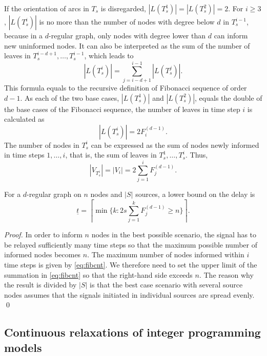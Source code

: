 If the orientation of arcs in $T_s$ is disregarded, $|L(T^1_s)|=|L(T^2_s)|=2$.
For $i\geq 3$, $|L(T^i_s)|$ is no more than the number of nodes with degree below $d$ in $T^{i-1}_s$, 
because in a $d$-regular graph, only nodes with degree lower than $d$ can inform new uninformed nodes.
It can also be interpreted as the sum of the number of leaves in $T^{i-d+1}_s,\dots,T^{i-1}_s$, which leads to %
\begin{equation*}
\label{eq:leafrec}
|L(T^i_s)|=\sum\limits_{j=i-d+1}^{i-1} |L(T^j_s)|.
\end{equation*}  
This formula equals to the recursive definition of Fibonacci sequence of order $d-1$.
As each of the two base cases, $|L(T^1_s)|$ and $|L(T^2_s)|$, equals the double of the base cases of the Fibonacci sequence, the number of leaves in time step $i$ is calculated as
\begin{equation*}
\label{eq:fibleaf}
|L(T^i_s)|=2 F^{(d-1)}_i.
\end{equation*}  
The number of nodes in $T^i_s$ can be expressed as the sum of nodes newly informed in time steps $1,\dots,i$, that is, the sum of leaves in $T^1_s,\dots,T^i_s$. Thus,
\begin{equation}
\label{eq:fibcnt}
|V_{T^i_s}|=|V_i|=2\sum\limits_{j=1}^i F^{(d-1)}_j.
\end{equation}

\begin{proposition}
For a $d$-regular graph on $n$ nodes and $|S|$ sources, a lower bound on the delay is 
\begin{equation*}
\label{lem:lbreg1}
\underline{t}=\left\lceil\min\{k:2s\sum\limits_{j=1}^k F^{(d-1)}_j\geq n\}\right\rceil.
\end{equation*}
\label{prop:lbfib}
\end{proposition}
\begin{proof}
In order to inform $n$ nodes in the best possible scenario, the signal has to be relayed sufficiently many time steps so that the maximum possible number of informed nodes becomes $n$.
The maximum number of nodes informed within $i$ time steps is given by \eqref{eq:fibcnt}.
We therefore need to set the upper limit of the summation in \eqref{eq:fibcnt} so that the right-hand side exceeds $n$.
The reason why the result is divided by $|S|$ is that the best case scenario with several source nodes assumes that the signals initiated in individual sources are spread evenly.
\qed
\end{proof}

\subsection{Continuous relaxations of integer programming models} \label{sec:lblprel}

